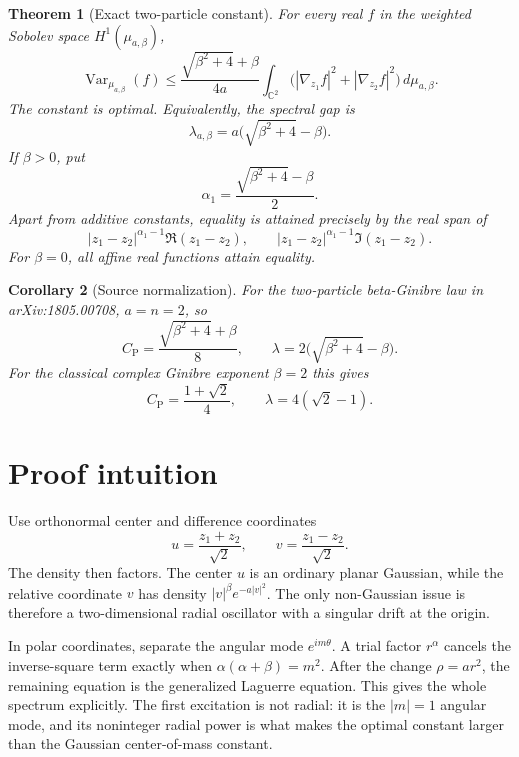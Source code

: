 \documentclass[11pt]{article}
\newtheorem{theorem}{Theorem}
\newtheorem{corollary}[theorem]{Corollary}
\newcommand{\C}{\mathbb C}
\newcommand{\Var}{\operatorname{Var}}
\newcommand{\dmu}{\,d\mu_{a,\beta}}
\begin{document}
\begin{theorem}[Exact two-particle constant]\label{thm:main}
For every real $f$ in the weighted Sobolev space $H^1(\mu_{a,\beta})$,
\begin{equation}\label{eq:PI}
 \Var_{\mu_{a,\beta}}(f)
 \leq \frac{\sqrt{\beta^2+4}+\beta}{4a}
 \int_{\C^2}\bigl(|\nabla_{z_1}f|^2+|\nabla_{z_2}f|^2\bigr)\dmu.
\end{equation}
The constant is optimal.  Equivalently, the spectral gap is
\begin{equation}\label{eq:gap}
 \lambda_{a,\beta}=a\bigl(\sqrt{\beta^2+4}-\beta\bigr).
\end{equation}
If $\beta>0$, put
\[
 \alpha_1=\frac{\sqrt{\beta^2+4}-\beta}{2}.
\]
Apart from additive constants, equality is attained precisely by the real
span of
\[
 |z_1-z_2|^{\alpha_1-1}\Re(z_1-z_2),\qquad
 |z_1-z_2|^{\alpha_1-1}\Im(z_1-z_2).
\]
For $\beta=0$, all affine real functions attain equality.
\end{theorem}

\begin{corollary}[Source normalization]\label{cor:source}
For the two-particle beta-Ginibre law in arXiv:1805.00708, $a=n=2$, so
\[
 C_{\mathrm P}=\frac{\sqrt{\beta^2+4}+\beta}{8},\qquad
 \lambda=2\bigl(\sqrt{\beta^2+4}-\beta\bigr).
\]
For the classical complex Ginibre exponent $\beta=2$ this gives
\[
 C_{\mathrm P}=\frac{1+\sqrt2}{4},\qquad
 \lambda=4(\sqrt2-1).
\]
\end{corollary}

\section{Proof intuition}

Use orthonormal center and difference coordinates
\[
 u=\frac{z_1+z_2}{\sqrt2},\qquad
 v=\frac{z_1-z_2}{\sqrt2}.
\]
The density then factors.  The center $u$ is an ordinary planar Gaussian,
while the relative coordinate $v$ has density
$|v|^\beta e^{-a|v|^2}$.  The only non-Gaussian issue is therefore a
two-dimensional radial oscillator with a singular drift at the origin.

In polar coordinates, separate the angular mode $e^{im\theta}$.  A trial
factor $r^\alpha$ cancels the inverse-square term exactly when
$\alpha(\alpha+\beta)=m^2$.  After the change $\rho=ar^2$, the remaining
equation is the generalized Laguerre equation.  This gives the whole
spectrum explicitly.  The first excitation is not radial: it is the
$|m|=1$ angular mode, and its noninteger radial power is what makes the
optimal constant larger than the Gaussian center-of-mass constant.
\end{document}
